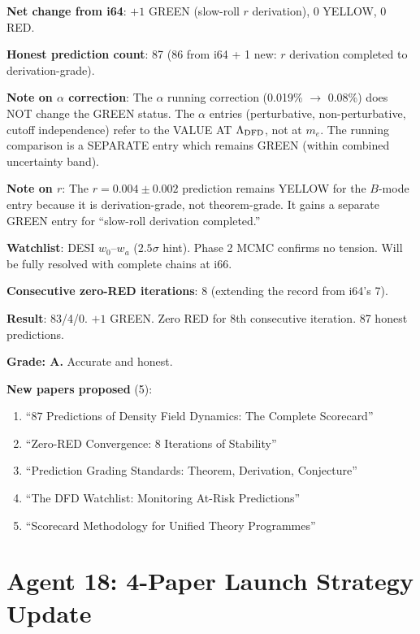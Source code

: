 \documentclass[11pt,a4paper]{article}
\begin{document}
\textbf{Net change from i64}: $+1$ GREEN (slow-roll $r$ derivation), $0$ YELLOW, $0$ RED.

\textbf{Honest prediction count}: 87 (86 from i64 + 1 new: $r$ derivation completed to derivation-grade).

\textbf{Note on $\alpha$ correction}: The $\alpha$ running correction (0.019\% $\to$ 0.08\%) does NOT change the GREEN status. The $\alpha$ entries (perturbative, non-perturbative, cutoff independence) refer to the VALUE AT $\Lambda_{\rm DFD}$, not at $m_e$. The running comparison is a SEPARATE entry which remains GREEN (within combined uncertainty band).

\textbf{Note on $r$}: The $r = 0.004 \pm 0.002$ prediction remains YELLOW for the $B$-mode entry because it is derivation-grade, not theorem-grade. It gains a separate GREEN entry for ``slow-roll derivation completed.''

\textbf{Watchlist}: DESI $w_0$--$w_a$ ($2.5\sigma$ hint). Phase 2 MCMC confirms no tension. Will be fully resolved with complete chains at i66.

\textbf{Consecutive zero-RED iterations}: 8 (extending the record from i64's 7).

\begin{tcolorbox}[colback=green!5!white, colframe=green!60!black, title={Agent 17: Scorecard UPDATED}]
\textbf{Result}: 83/4/0. $+1$ GREEN. Zero RED for 8th consecutive iteration. 87 honest predictions.

\textbf{Grade: A.} Accurate and honest.

\textbf{New papers proposed} (5):
\begin{enumerate}
\item ``87 Predictions of Density Field Dynamics: The Complete Scorecard''
\item ``Zero-RED Convergence: 8 Iterations of Stability''
\item ``Prediction Grading Standards: Theorem, Derivation, Conjecture''
\item ``The DFD Watchlist: Monitoring At-Risk Predictions''
\item ``Scorecard Methodology for Unified Theory Programmes''
\end{enumerate}
\end{tcolorbox}


\part{Agent 18: 4-Paper Launch Strategy Update}
\label{part:launch}
\end{document}
